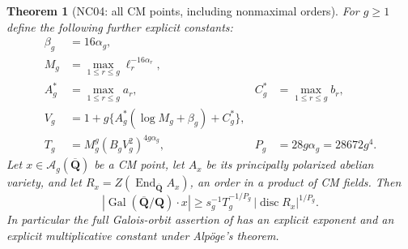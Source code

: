 \documentclass[11pt]{article}
\newtheorem{theorem}{Theorem}[section]
\theoremstyle{remark}
\begin{document}
\begin{theorem}[NC04: all CM points, including nonmaximal orders]
\label{NC04}
For $g\geq1$ define the following further explicit constants:
\begin{align*}
 \beta_g&=16\alpha_g,\\
 M_g&=\max_{1\leq r\leq g}\ell_r^{-16\alpha_r},\\
 A_g^*&=\max_{1\leq r\leq g}a_r,
 &C_g^*&=\max_{1\leq r\leq g}b_r,\\
 V_g&=1+g\{A_g^*(\log M_g+\beta_g)+C_g^*\},\\
 T_g&=M_g^g(B_gV_g^2)^{4g\alpha_g},
 &P_g&=28g\alpha_g=28672g^4.
\end{align*}
Let $x\in\mathcal A_g(\overline{\mathbf Q})$ be a CM point, let
$A_x$ be its principally polarized abelian variety, and let
$R_x=Z(\operatorname{End}_{\overline{\mathbf Q}}A_x)$, an order in a
product of CM fields.  Then
\begin{equation}\label{eq:NC04-orbit}
 |\operatorname{Gal}(\overline{\mathbf Q}/\mathbf Q)\cdot x|
 \geq s_g^{-1}T_g^{-1/P_g}\,|\operatorname{disc}R_x|^{1/P_g}.
\end{equation}
In particular the full Galois-orbit assertion of
\cite[Theorem~5.2, p.~385]{NC-Tsimerman2018} has an explicit exponent
and an explicit multiplicative constant under Alp\"oge's theorem.
\end{theorem}
\end{document}
